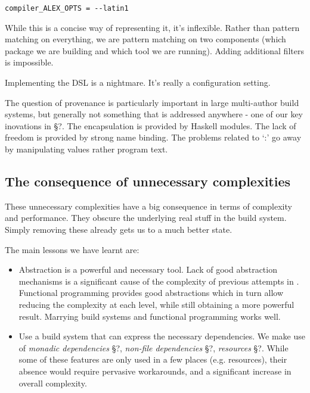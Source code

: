 \begin{lstlisting}
compiler_ALEX_OPTS = --latin1
\end{lstlisting}

While this is a concise way of representing it, it's inflexible. Rather than pattern matching on everything, we are pattern matching on two components (which package we are building and which tool we are running). Adding additional filters is impossible.

Implementing the DSL is a nightmare. It's really a configuration setting.


The question of provenance is particularly important in large multi-author build systems, but generally not something that is addressed anywhere - one of our key inovations in \S?. The encapsulation is provided by Haskell modules. The lack of freedom is provided by strong name binding. The problems related to `:' go away by manipulating values rather program text.


\subsection{The consequence of unnecessary complexities}

These unnecessary complexities have a big consequence in terms of complexity and performance. They obscure the underlying real stuff in the build system. Simply removing these already gets us to a much better state.

The main lessons we have learnt are:

\begin{itemize}
\item Abstraction is a powerful and necessary tool. Lack of good abstraction mechanisms is a significant cause of the complexity of previous attempts in \make{}. Functional programming provides good abstractions which in turn allow reducing the complexity at each level, while still obtaining a more powerful result. Marrying build systems and functional programming works well.
\item Use a build system that can express the necessary dependencies. We make use of \textit{monadic dependencies} \S?, \textit{non-file dependencies} \S?, \textit{resources} \S?. While some of these features are only used in a few places (e.g. resources), their absence would require pervasive workarounds, and a significant increase in overall complexity.
\end{itemize}

